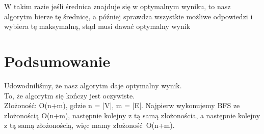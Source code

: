 \documentclass{article}
\theoremstyle{plain}
\begin{document}
W takim razie jeśli średnica znajduje się w optymalnym wyniku, to nasz algorytm bierze tę średnicę, a później sprawdza wszystkie możliwe odpowiedzi i wybiera tę maksymalną, stąd musi dawać optymalny wynik
\section{Podsumowanie}
Udowodniliśmy, że nasz algorytm daje optymalny wynik.\\
To, że algorytm się kończy jest oczywiste.\\

Złożoność: O(n+m), gdzie n = |V|, m = |E|.
Najpierw wykonujemy BFS ze złożonością O(n+m), następnie kolejny z tą samą złożonościa, a następnie kolejny z tą samą złożonością, więc mamy złożoność O(n+m).
\end{document}
